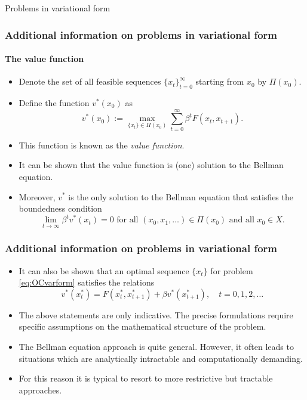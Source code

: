 \documentclass[10pt]{beamer}
\theoremstyle{definition}
\begin{document}
\begin{section}{Problems in variational form}
\begin{frame}[fragile]
\frametitle{Additional information on problems in variational form}
\framesubtitle{The value function}
\begin{itemize}\itemsep1em
\item Denote the set of all feasible sequences $  \{x_t\}_{t=0}^{\infty}$ starting from $ x_0 $ by $ \Pi(x_0) $.
\item Define the function $ v^*(x_0) $ as \[ v^*(x_0):= \max_{\{x_t\}\in \Pi(x_0)}\sum_{t=0}^{\infty}\beta^t F(x_t,x_{t+1}). \]
\item This function is known as the \emph{value function}.
\item It can be shown that the value function is (one) solution to the Bellman equation.
\item Moreover, $ v^* $ is the only solution to the Bellman equation that satisfies the boundedness condition \[ \lim\limits_{t\rightarrow \infty} \beta^t v^*(x_t) =0 \text{ for all }(x_0,x_1,\ldots)\in \Pi(x_0)\text{ and all }x_0\in X. \]
\end{itemize}
\end{frame}

\begin{frame}[fragile]
\frametitle{Additional information on problems in variational form}
\begin{itemize}\itemsep1em
\item It can also be shown that an optimal sequence $ \{x_t\} $ for problem \eqref{eq:OCvarform} satisfies the relations \[ v^*(x_t^*) = F(x_t^*,x_{t+1}^*)+\beta v^*(x_{t+1}^*),\quad t=0,1,2,\ldots \] \pause
\item \alert{The above statements are only indicative. The precise formulations require specific assumptions on the mathematical structure of the problem.} \pause
\item The Bellman equation approach is quite general. However, it often leads to situations which are analytically intractable and computationally demanding.
\item For this reason it is typical to resort to more restrictive but tractable approaches.
\end{itemize}
\end{frame}



\end{section}
\end{document}
